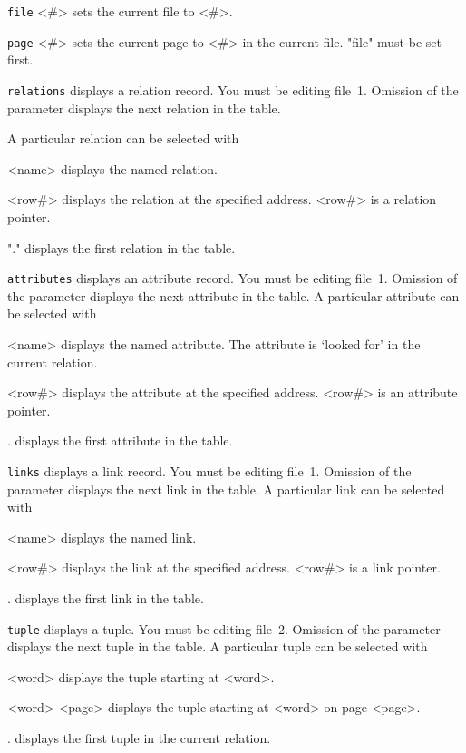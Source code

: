 \documentclass[11pt,a4paper]{report}
\begin{document}
\verb|file| <\#>\>
sets the current file to <\#>.
 
\verb|page| <\#>\>
sets the current page to <\#> in the current file.
"file" must be set first.
 
\verb|relations| \>
displays a relation record.
You must be editing file~1.
 Omission of the parameter displays
the next relation in the table. 

A particular relation can
be selected with
\begin{List}
\item[<name>] displays the named relation.
\item[<row\#>] displays the relation at the specified address.
  <row\#> is a relation pointer.
\item["."] displays the first relation in the table.
\end{List}
 
\verb|attributes| \>
displays an attribute record.
You must be editing file~1.
 Omission of the parameter displays
the next attribute in the table. A particular attribute can
be selected with
\begin{List}
\item[<name>] displays the named attribute.
 The attribute is `looked for' in the current relation.
\item[<row\#>] displays the attribute at the specified address.
  <row\#> is an attribute pointer.
\item[.] displays the first attribute in the table.
\end{List}
 
\verb|links| \>
displays a link record.
You must be editing file~1.
 Omission of the parameter displays
the next link in the table. A particular link can
be selected with
\begin{List}
\item[<name>] displays the named link.
\item[<row\#>] displays the link at the specified address.
  <row\#> is a link pointer.
\item[.] displays the first link in the table.
\end{List}
 
\verb|tuple| \>
displays a tuple.
You must be editing file~2.
 Omission of the parameter displays
the next tuple in the table. A particular tuple can
be selected with
\begin{List}
\item[<word>] displays the tuple starting at <word>.
\item[<word> <page>] displays the tuple starting at <word> on page <page>.
\item[.] displays the first tuple in the current relation.
\end{List}
 
\end{document}
